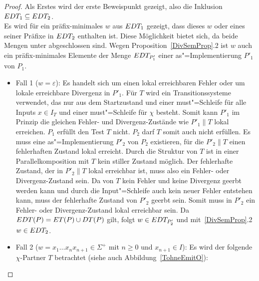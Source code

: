 \begin{proof}
  Als Erstes wird der erste Beweispunkt gezeigt, also die Inklusion $EDT
  _1\subseteq EDT _2$.\\
  Es wird für ein präfix-minimales $w$ aus $EDT _1$ gezeigt, dass dieses $w$
  oder eines seiner Präfixe in $EDT _2$ enthalten ist. Diese Möglichkeit
  bietet sich, da beide Mengen unter \cont{} abgeschlossen sind. Wegen
  Proposition~\ref{DivSemProp}.2 ist $w$ auch ein präfix-minimales Elemente
  der Menge $EDT _{P'_1}$ einer as"=Implementierung $P'_1$ von $P_1$.
  \begin{itemize}
    \item Fall 1 ($w=\varepsilon$): Es handelt sich um einen lokal erreichbaren
      Fehler oder um lokale erreichbare Divergenz in $P'_1$. Für $T$ wird ein
      Transitionssysteme verwendet, das nur aus dem Startzustand und einer
      must"=Schleife für alle Inputs $x\in I_T$ und einer must"=Schleife für
      $\chi$ besteht. Somit kann $P'_1$ im Prinzip die gleichen Fehler- und
      Divergenz-Zustände wie $P'_1\|T$ lokal erreichen. $P_1$ erfüllt den Test
      $T$ nicht. $P_2$ darf $T$ somit auch nicht erfüllen. Es muss eine
      as"=Implementierung $P'_2$ von $P_2$ existieren, für die $P'_2\|T$ einen
      fehlerhaften Zustand lokal erreicht. Durch die Struktur von $T$ ist in
      einer Parallelkomposition mit $T$ kein stiller Zustand möglich. Der
      fehlerhafte Zustand, der in $P'_2\|T$ lokal erreichbar ist, muss also ein
      Fehler- oder Divergenz-Zustand sein. Da von $T$ kein Fehler und keine
      Divergenz geerbt werden kann und durch die Input"=Schleife auch kein
      neuer Fehler entstehen kann, muss der fehlerhafte Zustand von $P'_2$
      geerbt sein. Somit muss in $P'_2$ ein Fehler- oder Divergenz-Zustand
      lokal erreichbar sein. Da $EDT (P) =ET (P)\cup DT (P)$ gilt, folgt
      $w\in EDT _{P'_2}$ und mit~\ref{DivSemProp}.2 $w\in EDT _2$.
    \item Fall 2 ($w=x_1\dots x_n x_{n+1}\in\Sigma ^+$ mit $n\geq 0$ und
      $x_{n+1}\in I$): Es wird der folgende $\chi$-Partner $T$ betrachtet
      (siehe auch Abbildung~\ref{TohneEmitO}):
\end{itemize}
\end{proof}
